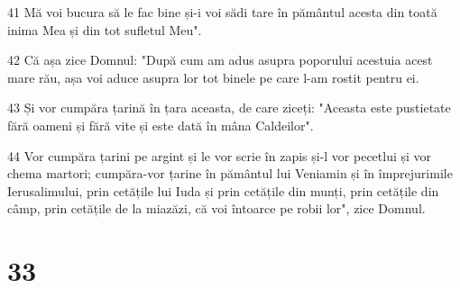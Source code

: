 \par 41 Mă voi bucura să le fac bine și-i voi sădi tare în pământul acesta din toată inima Mea și din tot sufletul Meu".
\par 42 Că așa zice Domnul: "După cum am adus asupra poporului acestuia acest mare rău, așa voi aduce asupra lor tot binele pe care l-am rostit pentru ei.
\par 43 Și vor cumpăra țarină în țara aceasta, de care ziceți: "Aceasta este pustietate fără oameni și fără vite și este dată în mâna Caldeilor".
\par 44 Vor cumpăra țarini pe argint și le vor scrie în zapis și-l vor pecetlui și vor chema martori; cumpăra-vor țarine în pământul lui Veniamin și în împrejurimile Ierusalimului, prin cetățile lui Iuda și prin cetățile din munți, prin cetățile din câmp, prin cetățile de la miazăzi, că voi întoarce pe robii lor", zice Domnul.

\chapter{33}

